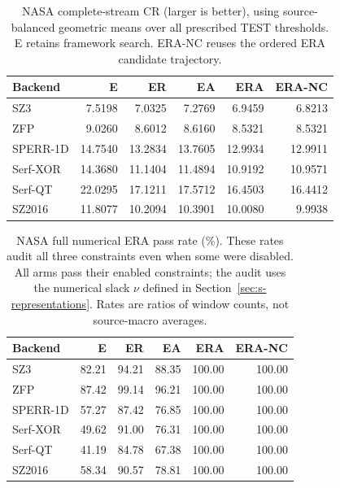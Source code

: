 \begin{table}[t]
\centering
\small
\setlength{\tabcolsep}{5pt}
\caption{NASA complete-stream CR (larger is better), using source-balanced geometric means over all prescribed TEST thresholds. E retains framework search. ERA-NC reuses the ordered ERA candidate trajectory.}
\label{tab:s-ablation-cr-anomaly}
\begin{tabular}{@{}lrrrrr@{}}
\toprule
Backend & E & ER & EA & ERA & ERA-NC \\
\midrule
SZ3 & 7.5198 & 7.0325 & 7.2769 & 6.9459 & 6.8213 \\
ZFP & 9.0260 & 8.6012 & 8.6160 & 8.5321 & 8.5321 \\
SPERR-1D & 14.7540 & 13.2834 & 13.7605 & 12.9934 & 12.9911 \\
Serf-XOR & 14.3680 & 11.1404 & 11.4894 & 10.9192 & 10.9571 \\
Serf-QT & 22.0295 & 17.1211 & 17.5712 & 16.4503 & 16.4412 \\
SZ2016 & 11.8077 & 10.2094 & 10.3901 & 10.0080 & 9.9938 \\
\bottomrule
\end{tabular}
\end{table}

\begin{table}[t]
\centering
\small
\setlength{\tabcolsep}{5pt}
\caption{NASA full numerical ERA pass rate (\%). These rates audit all three constraints even when some were disabled. All arms pass their enabled constraints; the audit uses the numerical slack $\nu$ defined in Section~\ref{sec:s-representations}. Rates are ratios of window counts, not source-macro averages.}
\label{tab:s-ablation-pass-anomaly}
\begin{tabular}{@{}lrrrrr@{}}
\toprule
Backend & E & ER & EA & ERA & ERA-NC \\
\midrule
SZ3 & 82.21 & 94.21 & 88.35 & 100.00 & 100.00 \\
ZFP & 87.42 & 99.14 & 96.21 & 100.00 & 100.00 \\
SPERR-1D & 57.27 & 87.42 & 76.85 & 100.00 & 100.00 \\
Serf-XOR & 49.62 & 91.00 & 76.31 & 100.00 & 100.00 \\
Serf-QT & 41.19 & 84.78 & 67.38 & 100.00 & 100.00 \\
SZ2016 & 58.34 & 90.57 & 78.81 & 100.00 & 100.00 \\
\bottomrule
\end{tabular}
\end{table}

